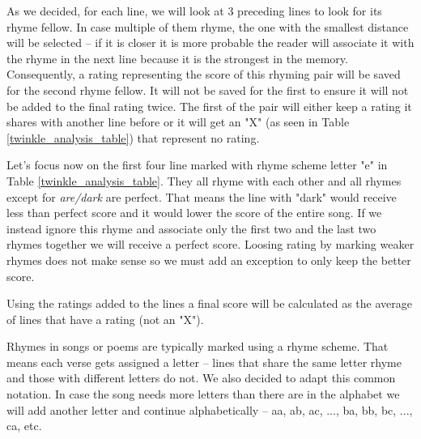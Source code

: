 As we decided, for each line, we will look at 3 preceding lines to look for its rhyme fellow. In case multiple of them rhyme, the one with the smallest distance will be selected -- if it is closer it is more probable the reader will associate it with the rhyme in the next line because it is the strongest in the memory. Consequently, a rating representing the score of this rhyming pair will be saved for the second rhyme fellow. It will not be saved for the first to ensure it will not be added to the final rating twice. The first of the pair will either keep a rating it shares with another line before or it will get an "X" (as seen in Table \ref{twinkle_analysis_table}) that represent no rating. 

Let's focus now on the first four line marked with rhyme scheme letter "e" in Table \ref{twinkle_analysis_table}. They all rhyme with each other and all rhymes except for \textit{are/dark} are perfect. That means the line with "dark" would receive less than perfect score and it would lower the score of the entire song. If we instead ignore this rhyme and associate only the first two and the last two rhymes together we will receive a perfect score. Loosing rating by marking weaker rhymes does not make sense so we must add an exception to only keep the better score.

Using the ratings added to the lines a final score will be calculated as the average of lines that have a rating (not an "X").



 Rhymes in songs or poems are typically marked using a rhyme scheme. That means each verse gets assigned a letter -- lines that share the same letter rhyme and those with different letters do not. We also decided to adapt this common notation. In case the song needs more letters than there are in the alphabet we will add another letter and continue alphabetically -- aa, ab, ac, ..., ba, bb, bc, ..., ca, etc.


